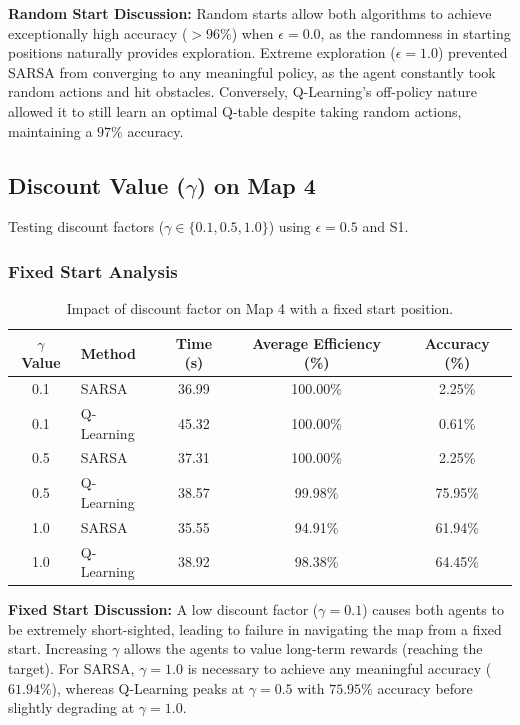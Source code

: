 \documentclass{article}
\begin{document}
\textbf{Random Start Discussion:} Random starts allow both algorithms to achieve exceptionally high accuracy ($>96\%$) when $\epsilon=0.0$, as the randomness in starting positions naturally provides exploration. Extreme exploration ($\epsilon=1.0$) prevented SARSA from converging to any meaningful policy, as the agent constantly took random actions and hit obstacles. Conversely, Q-Learning's off-policy nature allowed it to still learn an optimal Q-table despite taking random actions, maintaining a $97\%$ accuracy.


\subsection{Discount Value ($\gamma$) on Map 4}
Testing discount factors ($\gamma \in \{0.1, 0.5, 1.0\}$) using $\epsilon=0.5$ and S1.

\subsubsection{Fixed Start Analysis}
\begin{table}[H]
\centering
\begin{tabular}{clccc}
\toprule
\textbf{$\gamma$ Value} & \textbf{Method} & \textbf{Time (s)} & \textbf{Average Efficiency (\%)} & \textbf{Accuracy (\%)} \\ \midrule
0.1 & SARSA       & 36.99 & 100.00\% & 2.25\% \\
0.1 & Q-Learning  & 45.32 & 100.00\% & 0.61\% \\
0.5 & SARSA       & 37.31 & 100.00\% & 2.25\% \\
0.5 & Q-Learning  & 38.57 & 99.98\% & 75.95\% \\
1.0 & SARSA       & 35.55 & 94.91\% & 61.94\% \\
1.0 & Q-Learning  & 38.92 & 98.38\% & 64.45\% \\ \bottomrule
\end{tabular}
\caption{Impact of discount factor on Map 4 with a fixed start position.}
\end{table}

\textbf{Fixed Start Discussion:} A low discount factor ($\gamma=0.1$) causes both agents to be extremely short-sighted, leading to failure in navigating the map from a fixed start. Increasing $\gamma$ allows the agents to value long-term rewards (reaching the target). For SARSA, $\gamma=1.0$ is necessary to achieve any meaningful accuracy ($61.94\%$), whereas Q-Learning peaks at $\gamma=0.5$ with $75.95\%$ accuracy before slightly degrading at $\gamma=1.0$.
\end{document}
